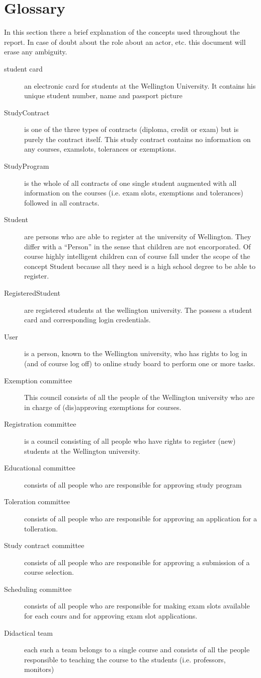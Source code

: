 \chapter{Glossary}
\label{glossary}

\npar In this section there a brief explanation of the concepts used throughout
the report. In case of doubt about the role about an actor, etc. this document
will erase any ambiguity.

\begin{description}
\item[student card] an electronic card for students at the Wellington University.
It contains his unique student number, name and passport picture
\item[StudyContract] is one of the three types of contracts (diploma, credit or
exam) but is purely the contract itself. This study contract contains no
information on any courses, examslots, tolerances or exemptions.
\item[StudyProgram] is the whole of all contracts of one single student
augmented with all information on the courses (i.e. exam slots, exemptions and
tolerances) followed in all contracts.
\item[Student] are persons who are able to register at the university of
Wellington. They differ with a ``Person'' in the sense that children are
not encorporated. Of course highly intelligent children can of course fall under
the scope of the concept Student because all they need is a high school degree
to be able to register.
\item[RegisteredStudent] are registered students at the wellington university.
The possess a student card and corresponding login credentials.
\item[User] is a person, known to the Wellington university, who has rights to
log in (and of course log off) to online study board to perform one or more
tasks.
\item[Exemption committee] This council consists of all the people of the
Wellington university who are in charge of (dis)approving exemptions for
courses.
\item[Registration committee] is a council consisting of all people who have
rights to register (new) students at the Wellington university.
\item[Educational committee] consists of all people who are responsible for
approving study program
\item[Toleration committee] consists of all people who are responsible for approving
an application for a tolleration.
\item[Study contract committee] consists of all people who are responsible for
approving a submission of a course selection.
\item[Scheduling committee] consists of all people who are responsible for making
exam slots available for each cours and for approving exam slot applications.
\item[Didactical team] each such a team belongs to a single course and consists of all 
the people responsible to teaching the course to the students (i.e. professors, monitors) 
\end{description}

